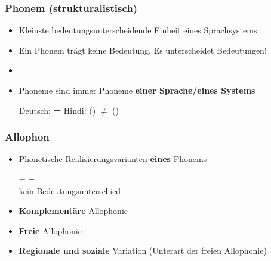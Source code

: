 \begin{frame}
\frametitle{Phonem (strukturalistisch)}

\begin{itemize}
	\item Kleinste bedeutungsunterscheidende Einheit eines Sprachsystems
	\item Ein Phonem trägt keine Bedeutung. Es unterscheidet Bedeutungen!
	\item[]
	\item Phoneme sind immer Phoneme \textbf{einer Sprache/eines Systems}

	\eal
		\ex Deutsch: \textipa{[papa]} \textbf{=} 
		\ex Hindi: \textipa{[pal]} () \textbf{$\neq$} \textipa{[p\super{h}al]} ()
	\zl

\end{itemize}

\end{frame}


\begin{frame}%
\frametitle{Allophon}

	\begin{itemize}
		\item Phonetische Realisierungsvarianten \textbf{eines} Phonems
		
		\ea {} =  =  \\ \ras kein Bedeutungsunterschied
		\z

		\item \textbf{Komplementäre} Allophonie

	\eal
	\ex[]{
          \textipa{[x]} \vs \textipa{[\c{c}]}
          }
	\ex[]{
          \textipa{[bax]} \vs \textipa{[mI\c{c}]}
          }
	\ex[*]{
          \textipa{[mIx]} \vs *\textipa{[ba\c{c}]}
          }
	\zl
	
		\item \textbf{Freie} Allophonie

		\ea \textipa{[p\super{h}as]} \vs \textipa{[pas]}
		\z
		
		\item \textbf{Regionale und soziale} Variation (Unterart der freien Allophonie)

		\ea \textipa{[PIS]} \vs \textipa{[PI\c{c}]}
		\z
		
	\end{itemize}

\end{frame}


